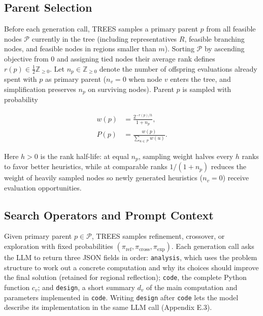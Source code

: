 \documentclass{article}
\begin{document}
\subsection{Parent Selection}\label{parent-selection}

Before each generation call, TREES samples a primary parent \(p\) from all feasible nodes \(\mathcal P\) currently in the tree (including representatives \(R\), feasible branching nodes, and feasible nodes in regions smaller than \(m\)). Sorting \(\mathcal P\) by ascending objective from \(0\) and assigning tied nodes their average rank defines \(r(p)\in\tfrac{1}{2}\mathbb Z_{\geq 0}\). Let \(n_p\in\mathbb Z_{\geq 0}\) denote the number of offspring evaluations already spent with \(p\) as primary parent (\(n_v=0\) when node \(v\) enters the tree, and simplification preserves \(n_p\) on surviving nodes). Parent \(p\) is sampled with probability

\[
\begin{aligned}
w(p) &= \frac{2^{-r(p)/h}}{1+n_p},\\
P(p) &= \frac{w(p)}{\sum_{u\in\mathcal P}w(u)}.
\end{aligned}
\tag{4}
\]

Here \(h>0\) is the rank half-life: at equal \(n_p\), sampling weight halves every \(h\) ranks to favor better heuristics, while at comparable ranks \(1/(1+n_p)\) reduces the weight of heavily sampled nodes so newly generated heuristics (\(n_v=0\)) receive evaluation opportunities.

\subsection{Search Operators and Prompt Context}\label{search-operators-and-prompt-context}

Given primary parent \(p\in\mathcal P\), TREES samples refinement, crossover, or exploration with fixed probabilities \((\pi_{\text{ref}},\pi_{\text{cross}},\pi_{\text{exp}})\). Each generation call asks the LLM to return three JSON fields in order: \texttt{analysis}, which uses the problem structure to work out a concrete computation and why its choices should improve the final solution (retained for regional reflection); \texttt{code}, the complete Python function \(c_v\); and \texttt{design}, a short summary \(d_v\) of the main computation and parameters implemented in \texttt{code}. Writing \texttt{design} after \texttt{code} lets the model describe its implementation in the same LLM call \citep{eoh, mctsahd} (Appendix E.3).
\end{document}

